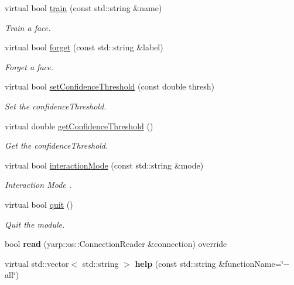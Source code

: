 \begin{DoxyCompactItemize}
\item 
virtual bool \mbox{\hyperlink{classrecognition__IDL_acf63e73eba86bdffa4620aa4240ed17f}{train}} (const std\+::string \&name)
\begin{DoxyCompactList}\small\item\em Train a face. \end{DoxyCompactList}\item 
virtual bool \mbox{\hyperlink{classrecognition__IDL_a5ddaf7e807d0bb5685ee4b87e8817bf3}{forget}} (const std\+::string \&label)
\begin{DoxyCompactList}\small\item\em Forget a face. \end{DoxyCompactList}\item 
virtual bool \mbox{\hyperlink{classrecognition__IDL_ab4ab3c0a86b630b85e411ff39720fc3d}{set\+Confidence\+Threshold}} (const double thresh)
\begin{DoxyCompactList}\small\item\em Set the confidence\+Threshold. \end{DoxyCompactList}\item 
virtual double \mbox{\hyperlink{classrecognition__IDL_a5cc457fe6b185acc8a4b1f541a002cee}{get\+Confidence\+Threshold}} ()
\begin{DoxyCompactList}\small\item\em Get the confidence\+Threshold. \end{DoxyCompactList}\item 
virtual bool \mbox{\hyperlink{classrecognition__IDL_afb70498b2cf99712cfad0e19d171dcab}{interaction\+Mode}} (const std\+::string \&mode)
\begin{DoxyCompactList}\small\item\em Interaction Mode . \end{DoxyCompactList}\item 
virtual bool \mbox{\hyperlink{classrecognition__IDL_a42d5f63c8461c081cf2c17311bed5375}{quit}} ()
\begin{DoxyCompactList}\small\item\em Quit the module. \end{DoxyCompactList}\item 
\mbox{\label{classrecognition__IDL_a4dee551f9609961d691081cd6dcd352f}} 
bool {\bfseries read} (yarp\+::os\+::\+Connection\+Reader \&connection) override
\item 
\mbox{\label{classrecognition__IDL_aeb060873c369bd091441e56dcdac7964}} 
virtual std\+::vector$<$ std\+::string $>$ {\bfseries help} (const std\+::string \&function\+Name=\char`\"{}-\/-\/all\char`\"{})
\end{DoxyCompactItemize}



